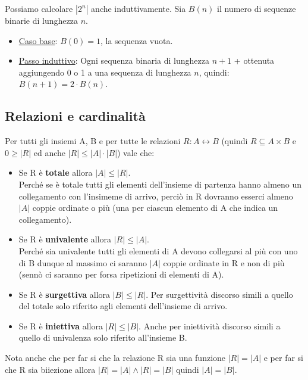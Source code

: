 \hspace{-15pt}Possiamo calcolare $|2^n|$ anche induttivamente. Sia $B(n)$ il numero di sequenze binarie di lunghezza $n$.
\begin{itemize}
    \item \underline{Caso base}: $B(0) = 1$, la sequenza vuota.
    \item \underline{Passo induttivo}: Ogni sequenza binaria di lunghezza $n+1$ + ottenuta aggiungendo 0 o 1 a una sequenza di lunghezza $n$, quindi: $B(n+1) = 2 \cdot B(n)$.
\end{itemize}

\newpage
\subsection{Relazioni e cardinalità}
\begin{proposition}\label{prop-rel-card-1}
Per tutti gli insiemi A, B e per tutte le relazioni $R: A \leftrightarrow B$ (quindi $R\subseteq A \times B$ e $0\geq |R|$ ed anche $|R| \leq |A| \cdot |B|$) vale che:
\begin{itemize}
    \item Se R è \textbf{totale} allora $|A|\leq |R|$.\\
    Perché se è totale tutti gli elementi dell'insieme di partenza hanno almeno un collegamento con l'insimeme di arrivo, perciò in R dovranno esserci almeno $|A|$ coppie ordinate o più (una per ciascun elemento di A che indica un collegamento).
    \item Se R è \textbf{univalente} allora $|R|\leq |A|$.\\
    Perché sia univalente tutti gli elementi di A devono collegarsi al più con uno di B dunque al massimo ci saranno $|A|$ coppie ordinate in R e non di più (sennò ci saranno per forsa ripetizioni di elementi di A).
    \item Se R è \textbf{surgettiva} allora $|B|\leq |R|$.
    Per surgettività discorso simili a quello del totale solo riferito agli elementi dell'insieme di arrivo.
    \item Se R è \textbf{iniettiva} allora $|R|\leq |B|$.
    Anche per iniettività discorso simili a quello di univalenza solo riferito all'insieme B.
\end{itemize}
\end{proposition}

\begin{note}\label{nota-1}
Nota anche che per far si che la relazione R sia una funzione $|R| = |A|$ e per far si che R sia biiezione allora $|R| = |A| \land |R| = |B|$ quindi $|A| = |B|$.
\end{note}

